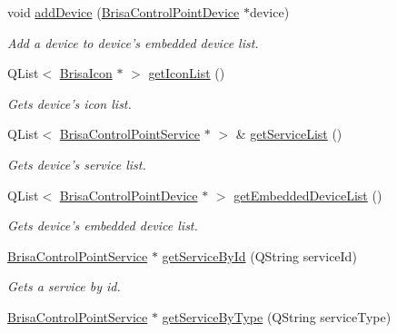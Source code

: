 \begin{DoxyCompactItemize}
void \hyperlink{classBrisaUpnp_1_1BrisaControlPointDevice_a37f7856e412c8450f3eba3ff6634e9a5}{addDevice} (\hyperlink{classBrisaUpnp_1_1BrisaControlPointDevice}{BrisaControlPointDevice} $\ast$device)
\begin{DoxyCompactList}\small\item\em Add a device to device's embedded device list. \item\end{DoxyCompactList}\item 
QList$<$ \hyperlink{classBrisaUpnp_1_1BrisaIcon}{BrisaIcon} $\ast$ $>$ \hyperlink{classBrisaUpnp_1_1BrisaControlPointDevice_a7ba66830494b0180e2d36b25bb09fd4c}{getIconList} ()
\begin{DoxyCompactList}\small\item\em Gets device's icon list. \item\end{DoxyCompactList}\item 
QList$<$ \hyperlink{classBrisaUpnp_1_1BrisaControlPointService}{BrisaControlPointService} $\ast$ $>$ \& \hyperlink{classBrisaUpnp_1_1BrisaControlPointDevice_a869e15a65859b2f576cc33e1735ff72f}{getServiceList} ()
\begin{DoxyCompactList}\small\item\em Gets device's service list. \item\end{DoxyCompactList}\item 
QList$<$ \hyperlink{classBrisaUpnp_1_1BrisaControlPointDevice}{BrisaControlPointDevice} $\ast$ $>$ \hyperlink{classBrisaUpnp_1_1BrisaControlPointDevice_acf70b56c7d5219eabfb00c583370acaa}{getEmbeddedDeviceList} ()
\begin{DoxyCompactList}\small\item\em Gets device's embedded device list. \item\end{DoxyCompactList}\item 
\hyperlink{classBrisaUpnp_1_1BrisaControlPointService}{BrisaControlPointService} $\ast$ \hyperlink{classBrisaUpnp_1_1BrisaControlPointDevice_aca17b2f4f228ad68da6ed1861b8ea4c4}{getServiceById} (QString serviceId)
\begin{DoxyCompactList}\small\item\em Gets a service by id. \item\end{DoxyCompactList}\item 
\hyperlink{classBrisaUpnp_1_1BrisaControlPointService}{BrisaControlPointService} $\ast$ \hyperlink{classBrisaUpnp_1_1BrisaControlPointDevice_ae89c14d455a11f82fa8eeba2d97e2f74}{getServiceByType} (QString serviceType)

\end{DoxyCompactItemize}

